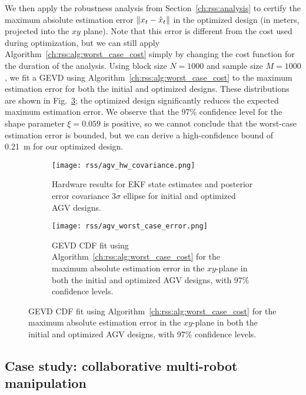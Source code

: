 We then apply the robustness analysis from Section~\ref{ch:rss:analysis} to certify the maximum absolute estimation error $\left\lVert x_t - \hat{x}_t\right\rVert$ in the optimized design (in meters, projected into the $xy$ plane). Note that this error is different from the cost used during optimization, but we can still apply Algorithm~\ref{ch:rss:alg:worst_case_cost} simply by changing the cost function for the duration of the analysis. Using block size $N = 1000$ and sample size $M = 1000$, we fit a GEVD using Algorithm~\ref{ch:rss:alg:worst_case_cost} to the maximum estimation error for both the initial and optimized designs. These distributions are shown in Fig.~\ref{ch:rss:fig:agv_gevd}; the optimized design significantly reduces the expected maximum estimation error. We observe that the 97\% confidence level for the shape parameter $\xi = 0.059$ is positive, so we cannot conclude that the worst-case estimation error is bounded, but we can derive a high-confidence bound of \SI{0.21}{m} for our optimized design.

\begin{figure}[tb]
    \centering
    \begin{subfigure}[c]{0.45\linewidth}
        \centering
        \texttt{[image: rss/agv\_hw\_covariance.png]}
        \caption{Hardware results for EKF state estimates and posterior error covariance $3\sigma$ ellipse for initial and optimized AGV designs.}
        \label{ch:rss:fig:agv_hw_cov}
    \end{subfigure}
    \quad
    \begin{subfigure}[c]{0.45\linewidth}
        \centering
        \texttt{[image: rss/agv\_worst\_case\_error.png]}
        \caption{GEVD CDF fit using Algorithm~\ref{ch:rss:alg:worst_case_cost} for the maximum absolute estimation error in the $xy$-plane in both the initial and optimized AGV designs, with 97\% confidence levels.}
        \label{ch:rss:fig:agv_gevd}
    \end{subfigure}
\end{figure}

\subsection{Case study: collaborative multi-robot manipulation}\label{ch:rss:case2}

